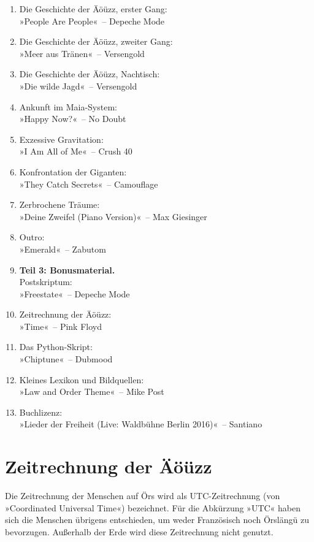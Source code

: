 \begin{enumerate}
    \item Die Geschichte der Äöüzz, erster Gang:\\ »People Are People«~– Depeche Mode
    \item Die Geschichte der Äöüzz, zweiter Gang:\\ »Meer aus Tränen«~– Versengold
    \item Die Geschichte der Äöüzz, Nachtisch:\\ »Die wilde Jagd«~– Versengold
    \item Ankunft im Maia-System:\\ »Happy Now?«~– No Doubt
    \item Exzessive Gravitation:\\ »I Am All of Me«~– Crush 40
    \item Konfrontation der Giganten:\\ »They Catch Secrets«~– Camouflage
    \item Zerbrochene Träume:\\ »Deine Zweifel (Piano Version)«~– Max Giesinger
    \item Outro:\\ »Emerald«~– Zabutom
    \item \textbf{Teil 3: Bonusmaterial.}\\ Postskriptum:\\ »Freestate«~– Depeche Mode
    \item Zeitrechnung der Äöüzz:\\ »Time«~– Pink Floyd
    \item Das Python-Skript:\\ »Chiptune«~– Dubmood
    \item Kleines Lexikon und Bildquellen:\\ »Law and Order Theme«~– Mike Post
    \item Buchlizenz:\\ »Lieder der Freiheit (Live: Waldbühne Berlin 2016)«~– Santiano
\end{enumerate}


\chapter{Zeitrechnung der Äöüzz}

Die Zeitrechnung der Menschen auf Örs wird als UTC-Zeitrechnung (von »Coordinated Universal Time«) bezeichnet. Für die Abkürzung »UTC« haben sich die Menschen übrigens entschieden, um weder Französisch noch Örslängü zu bevorzugen. Außerhalb der Erde wird diese Zeitrechnung nicht genutzt.

